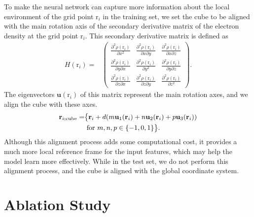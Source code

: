 \documentclass[%
twocolumn,
amsmath,
amssymb,
groupedaddress,
reprint,%
]{revtex4-2}
\newcommand{\nl}{\nonumber \\}
\newcommand{\brm}[1]{\bm{\mathrm{#1}}}
\begin{document}
To make the neural network can capture more information about the local environment of the grid point $\brm{r}_{i}$ in the training set, we set the cube to be aligned with the main rotation axis of the secondary derivative matrix of the electron density at the grid point $\brm{r}_{i}$.
%
This secondary derivative matrix is defined as
\begin{align}
  H(\brm{r}_{i}) =
   & \begin{pmatrix}
       \frac{\partial^{2} \rho(\brm{r}_{i})}{\partial x^{2}}        & \frac{\partial^{2} \rho(\brm{r}_{i})}{\partial x \partial y} & \frac{\partial^{2} \rho(\brm{r}_{i})}{\partial x \partial z} \\
       \frac{\partial^{2} \rho(\brm{r}_{i})}{\partial y \partial x} & \frac{\partial^{2} \rho(\brm{r}_{i})}{\partial y^{2}}        & \frac{\partial^{2} \rho(\brm{r}_{i})}{\partial y \partial z} \\
       \frac{\partial^{2} \rho(\brm{r}_{i})}{\partial z \partial x} & \frac{\partial^{2} \rho(\brm{r}_{i})}{\partial z \partial y} & \frac{\partial^{2} \rho(\brm{r}_{i})}{\partial z^{2}}
     \end{pmatrix}.
\end{align}
% 
The eigenvectors $\mathbf{u}(\brm{r}_{i})$ of this matrix represent the main rotation axes, and we align the cube with these axes.
% 
\begin{align}
  \mathbf{r}_{i;\rm{cube}} =
   & \big\{ \mathbf{r}_{i} + d (m \mathbf{u}_{1}(\brm{r}_{i}) + n \mathbf{u}_{2}(\brm{r}_{i}) + p \mathbf{u}_{3}(\brm{r}_{i})) \nl
   & \text{ for } m,n,p \in \{-1,0,1\} \big\}.
\end{align}
% 
Although this alignment process adds some computational cost, it provides a much more local reference frame for the input features, which may help the model learn more effectively.
% 
While in the test set, we do not perform this alignment process, and the cube is aligned with the global coordinate system.

\section{Ablation Study}
\end{document}
